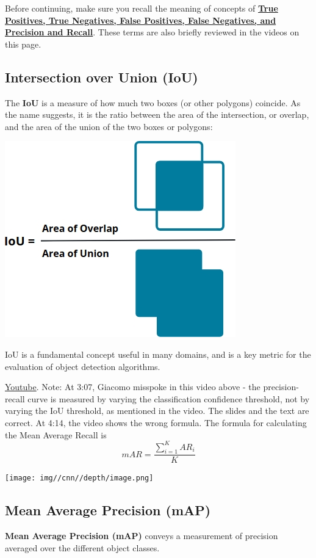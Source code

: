 Before continuing, make sure you recall the meaning of concepts of \href{https://en.wikipedia.org/wiki/Precision_and_recall}{\textbf{True Positives, True Negatives, False Positives, False Negatives, and Precision and Recall}}. These terms are also briefly reviewed in the videos on this page.

\subsection{Intersection over Union (IoU)}

The \textbf{IoU} is a measure of how much two boxes (or other polygons) coincide. As the name suggests, it is the ratio between the area of the intersection, or overlap, and the area of the union of the two boxes or polygons:

\includegraphics[width=0.5\linewidth]{img//cnn//depth/iou-2.jpeg}

IoU is a fundamental concept useful in many domains, and is a key metric for the evaluation of object detection algorithms. \newline

\href{https://www.youtube.com/watch?v=hkBC6WSydIk&ab_channel=Udacity}{Youtube}. Note: At 3:07, Giacomo misspoke in this video above - the precision-recall curve is measured by varying the classification confidence threshold, not by varying the IoU threshold, as mentioned in the video. The slides and the text are correct. At 4:14, the video shows the wrong formula. The formula for calculating the Mean Average Recall is \[mAR = \frac{\sum_{i=1}^K AR_i}{K}\]

\texttt{[image: img//cnn//depth/image.png]}

\subsection{Mean Average Precision (mAP)}

\textbf{Mean Average Precision (mAP)} conveys a measurement of precision averaged over the different object classes. \newline

